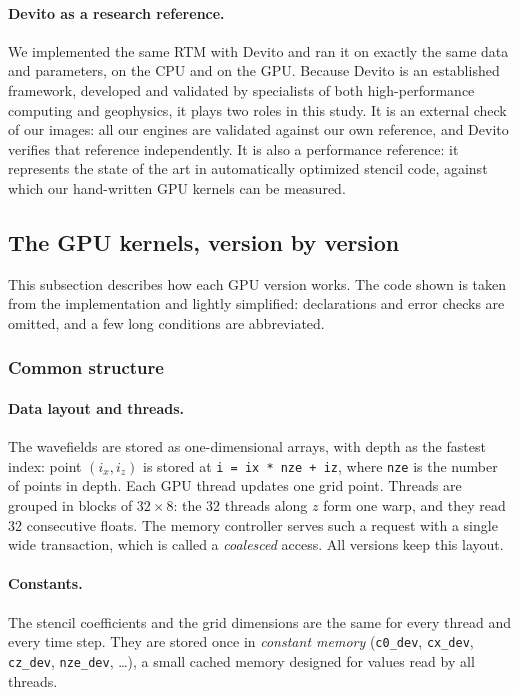 \documentclass[letterpaper,11pt,leqno]{article}
\begin{document}
\paragraph{Devito as a research reference.}
We implemented the same RTM with Devito and ran it on exactly the same data
and parameters, on the CPU and on the GPU. Because Devito is an established
framework, developed and validated by specialists of both high-performance
computing and geophysics, it plays two roles in this study. It is an
external check of our images: all our engines are validated against our own
reference, and Devito verifies that reference independently. It is also a
performance reference: it represents the state of the art in automatically
optimized stencil code, against which our hand-written GPU kernels can be
measured.

\subsection{The GPU kernels, version by version}

This subsection describes how each GPU version works. The code shown is taken
from the implementation and lightly simplified: declarations and error checks
are omitted, and a few long conditions are abbreviated.

\subsubsection{Common structure}

\paragraph{Data layout and threads.}
The wavefields are stored as one-dimensional arrays, with depth as the
fastest index: point $(i_x, i_z)$ is stored at \texttt{i = ix * nze + iz},
where \texttt{nze} is the number of points in depth. Each GPU thread updates
one grid point. Threads are grouped in blocks of $32 \times 8$: the 32 threads
along $z$ form one warp, and they read 32 consecutive floats. The memory
controller serves such a request with a single wide transaction, which is
called a \emph{coalesced} access. All versions keep this layout.

\paragraph{Constants.}
The stencil coefficients and the grid dimensions are the same for every
thread and every time step. They are stored once in \emph{constant memory}
(\texttt{c0\_dev}, \texttt{cx\_dev}, \texttt{cz\_dev}, \texttt{nze\_dev},
\ldots), a small cached memory designed for values read by all threads.
\end{document}
